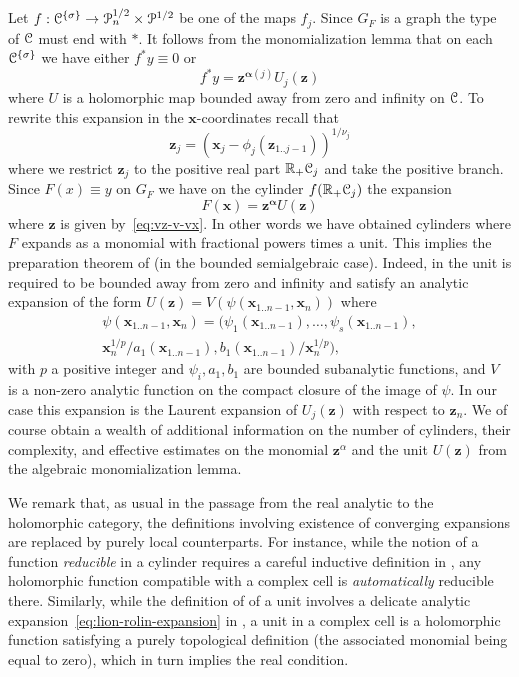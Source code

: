\documentclass[reqno]{amsart}
\renewcommand\~[1]{\widetilde{#1}}
\def\cP{{\mathcal P}} \def\cR{{\mathcal R}}
\def\vx{{\mathbf x}}
\def\vz{{\mathbf z}}
\def\valpha{{\boldsymbol\alpha}}
\def\he#1{{\{#1\}}}
\def\hsigma{{\he\sigma}}
\begin{document}
Let $f:\cC^\hsigma\to\cP_n^{1/2}\times\cP^{1/2}$ be one of the maps
$f_j$. Since $G_F$ is a graph the type of ${\mathcal C}$ must end with $*$. It
follows from the monomialization lemma that on each $\cC^\hsigma$ we have
either $f^*y\equiv0$ or
\begin{equation}
  f^* y = \vz^{\valpha(j)} U_j(\vz)
\end{equation}
where $U$ is a holomorphic map bounded away from zero and infinity on
${\mathcal C}$. To rewrite this expansion in the $\vx$-coordinates recall that
\begin{equation}\label{eq:vz-v-vx}
  \vz_j = (\vx_j - \phi_j(\vz_{1..j-1}))^{1/\nu_j}
\end{equation}
where we restrict $\vz_j$ to the positive real part ${\mathbb R}_+{\mathcal C}_j$ and
take the positive branch. Since $F(x)\equiv y$ on $G_F$ we have on
the cylinder $f({\mathbb R}_+{\mathcal C}_j)$ the expansion
\begin{equation}
  F(\vx) = \vz^\valpha U(\vz)
\end{equation}
where $\vz$ is given by~\eqref{eq:vz-v-vx}. In other words we have
obtained cylinders where $F$ expands as a monomial with fractional
powers times a unit. This implies the preparation theorem of
\cite{lion-rolin} (in the bounded semialgebraic case). Indeed, in
\cite{lion-rolin} the unit is required to be bounded away from zero
and infinity and satisfy an analytic expansion of the form
$U(\vz) = V(\psi(\vx_{1..n-1},\vx_n))$ where
\begin{multline}\label{eq:lion-rolin-expansion}
  \psi(\vx_{1..n-1},\vx_n) = (\psi_1(\vx_{1..n-1}),\ldots,\psi_s(\vx_{1..n-1}),\\
  \vx_n^{1/p}/a_1(\vx_{1..n-1}),b_1(\vx_{1..n-1})/\vx_n^{1/p}),
\end{multline}
with $p$ a positive integer and $\psi_i,a_1,b_1$ are bounded
subanalytic functions, and $V$ is a non-zero analytic function on the
compact closure of the image of $\psi$. In our case this expansion is
the Laurent expansion of $U_j(\vz)$ with respect to $\vz_n$. We of
course obtain a wealth of additional information on the number of
cylinders, their complexity, and effective estimates on the monomial
$\vz^\alpha$ and the unit $U(\vz)$ from the algebraic monomialization
lemma.

We remark that, as usual in the passage from the real analytic to the
holomorphic category, the definitions involving existence of
converging expansions are replaced by purely local counterparts. For
instance, while the notion of a function \emph{reducible} in a
cylinder requires a careful inductive definition in \cite{lion-rolin},
any holomorphic function compatible with a complex cell is
\emph{automatically} reducible there. Similarly, while the definition
of of a unit involves a delicate analytic
expansion~\eqref{eq:lion-rolin-expansion} in \cite{lion-rolin}, a unit
in a complex cell is a holomorphic function satisfying a purely
topological definition (the associated monomial being equal to zero),
which in turn implies the real condition.
\end{document}
